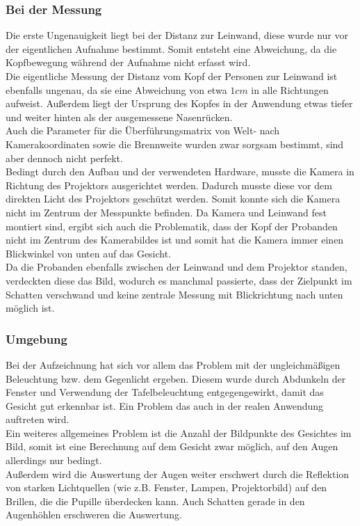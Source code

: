 \subsubsection{Bei der Messung}
Die erste Ungenauigkeit liegt bei der Distanz zur Leinwand, diese wurde nur vor der eigentlichen Aufnahme bestimmt. Somit entsteht eine Abweichung, da die Kopfbewegung während der Aufnahme nicht erfasst wird.\\
Die eigentliche Messung der Distanz  vom Kopf der Personen zur Leinwand ist ebenfalls ungenau, da sie eine Abweichung von etwa $1cm$ in alle Richtungen aufweist. Außerdem liegt der Ursprung des Kopfes in der Anwendung etwas tiefer und weiter hinten als der ausgemessene Nasenrücken.\\
Auch die Parameter für die Überführungsmatrix von Welt- nach Kamerakoordinaten sowie die Brennweite wurden zwar sorgsam bestimmt, sind aber dennoch nicht perfekt.\\
Bedingt durch den Aufbau und der verwendeten Hardware, musste die Kamera in Richtung des Projektors ausgerichtet werden.  Dadurch musste diese vor dem direkten Licht des Projektors geschützt werden. Somit konnte sich die Kamera nicht im Zentrum der Messpunkte befinden. 
Da Kamera und Leinwand fest montiert sind, ergibt sich auch die Problematik, dass der Kopf der Probanden nicht im Zentrum des Kamerabildes ist und somit hat die Kamera immer einen Blickwinkel von unten auf das Gesicht.\\
Da die Probanden ebenfalls zwischen der Leinwand und dem Projektor standen, verdeckten diese das Bild, wodurch es manchmal passierte, dass der Zielpunkt im Schatten verschwand und keine zentrale Messung mit Blickrichtung nach unten möglich ist.
\subsubsection{Umgebung}
Bei der Aufzeichnung hat sich vor allem das Problem mit der ungleichmäßigen Beleuchtung bzw. dem Gegenlicht ergeben. Diesem wurde durch Abdunkeln der Fenster und Verwendung der Tafelbeleuchtung entgegengewirkt, damit das Gesicht gut erkennbar ist. Ein Problem das auch in der realen Anwendung auftreten wird.\\
Ein weiteres allgemeines Problem ist die Anzahl der Bildpunkte des Gesichtes im Bild, somit ist eine Berechnung auf dem Gesicht zwar möglich, auf den Augen allerdings nur bedingt.\\
Außerdem wird die Auswertung der Augen weiter erschwert durch die Reflektion von starken Lichtquellen (wie z.B. Fenster, Lampen, Projektorbild) auf den Brillen, die die Pupille überdecken kann. Auch Schatten gerade in den Augenhöhlen erschweren die Auswertung.
